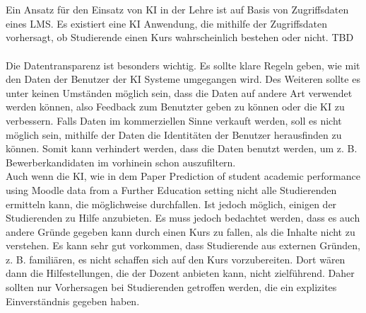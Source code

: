 \\
\\ \noindent
Ein Ansatz für den Einsatz von KI in der Lehre ist auf Basis von Zugriffsdaten eines \ac{LMS}.
Es existiert eine KI Anwendung, die mithilfe der Zugriffsdaten vorhersagt, ob Studierende einen Kurs wahrscheinlich bestehen oder nicht. TBD
\\
\\ \noindent
Die Datentransparenz ist besonders wichtig.
Es sollte klare Regeln geben, wie mit den Daten der Benutzer der KI Systeme umgegangen wird.
Des Weiteren sollte es unter keinen Umständen möglich sein, dass die Daten auf andere Art verwendet werden können, also Feedback zum Benutzter geben zu können oder die KI zu verbessern.
Falls Daten im kommerziellen Sinne verkauft werden, soll es nicht möglich sein, mithilfe der Daten die Identitäten der Benutzer herausfinden zu können.
Somit kann verhindert werden, dass die Daten benutzt werden, um z. B. Bewerberkandidaten im vorhinein schon auszufiltern. %
\\ \noindent
Auch wenn die KI, wie in dem Paper \glqq Prediction of student academic performance using Moodle data from a Further Education setting\grqq{} nicht alle Studierenden ermitteln kann, die möglichweise durchfallen. %
Ist jedoch möglich, einigen der Studierenden zu Hilfe anzubieten. Es muss jedoch bedachtet werden, dass es auch andere Gründe gegeben kann durch einen Kurs zu fallen, als die Inhalte nicht zu verstehen.
Es kann sehr gut vorkommen, dass Studierende aus externen Gründen, z. B. familiären, es nicht schaffen sich auf den Kurs vorzubereiten.
Dort wären dann die Hilfestellungen, die der Dozent anbieten kann, nicht zielführend.
Daher sollten nur Vorhersagen bei Studierenden getroffen werden, die ein explizites Einverständnis gegeben haben.